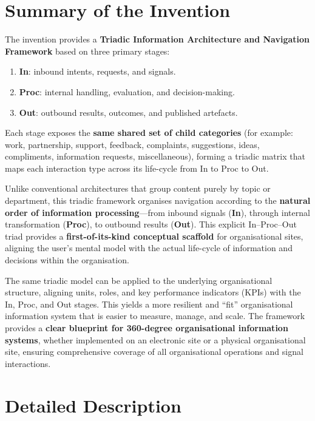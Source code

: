 \documentclass[11pt,a4paper]{article}
\begin{document}
\section*{Summary of the Invention}

The invention provides a \textbf{Triadic Information Architecture and Navigation Framework} based on three primary stages:
\begin{enumerate}[label=\alph*)]
  \item \textbf{In}: inbound intents, requests, and signals.
  \item \textbf{Proc}: internal handling, evaluation, and decision-making.
  \item \textbf{Out}: outbound results, outcomes, and published artefacts.
\end{enumerate}

Each stage exposes the \textbf{same shared set of child categories} (for example: work, partnership, support, feedback, complaints, suggestions, ideas, compliments, information requests, miscellaneous), forming a triadic matrix that maps each interaction type across its life-cycle from In to Proc to Out.

Unlike conventional architectures that group content purely by topic or department, this triadic framework organises navigation according to the \textbf{natural order of information processing}---from inbound signals (\textbf{In}), through internal transformation (\textbf{Proc}), to outbound results (\textbf{Out}). This explicit In--Proc--Out triad provides a \textbf{first-of-its-kind conceptual scaffold} for organisational sites, aligning the user's mental model with the actual life-cycle of information and decisions within the organisation.

The same triadic model can be applied to the underlying organisational structure, aligning units, roles, and key performance indicators (KPIs) with the In, Proc, and Out stages. This yields a more resilient and ``fit'' organisational information system that is easier to measure, manage, and scale. The framework provides a \textbf{clear blueprint for 360-degree organisational information systems}, whether implemented on an electronic site or a physical organisational site, ensuring comprehensive coverage of all organisational operations and signal interactions.

\section*{Detailed Description}
\end{document}
